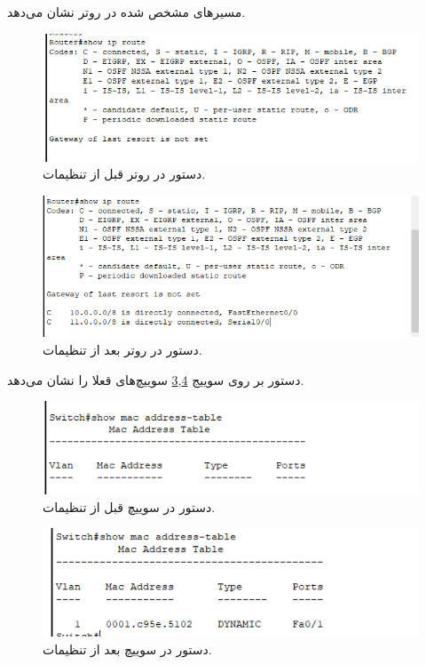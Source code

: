 \documentclass{perassignments}
\begin{document}
	مسیر‌های مشخص شده در روتر نشان می‌دهد. 
	 \begin{figure}[H]
	 	\centering
	 	\includegraphics[width= 0.7\linewidth]{graphics/f.png}
	 	\caption{
	 		دستور	
	 		 	در روتر قبل از تنظیمات.}
	 	\label{fig:f}
	 \end{figure}
	 \begin{figure}[H]
	 	\centering
	 	\includegraphics[width= 0.7\linewidth]{graphics/f1.png}
	 	\caption{
	 		دستور	
	 		در روتر بعد از تنظیمات.}
	 	\label{fig:f1}
	 \end{figure}
 	دستور 
 	بر روی سوییج 
 	\ref{fig:g},\ref{fig:g1}
 	سوییچ‌های قعلا را نشان می‌دهد. 
 	\begin{figure}[H]
 		\centering
 		\includegraphics[width= 0.7\linewidth]{graphics/g.png}
 		\caption{
 			دستور	
 			در سوییچ قبل از تنظیمات.}
 		\label{fig:g}
 	\end{figure}
 	\begin{figure}[H]
 		\centering
 		\includegraphics[width= 0.7\linewidth]{graphics/g1.png}
 		\caption{
 			دستور	
 			در سوییچ بعد از تنظیمات.}
 		\label{fig:g1}
 	\end{figure}
\end{document}
